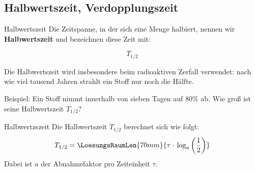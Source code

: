 \newpage

\subsection{Halbwertszeit, Verdopplungszeit}

\begin{definition}{Halbwertszeit}{}
Die Zeitspanne, in der sich eine Menge halbiert, nennen wir
\textbf{Halbwertszeit} und bezeichnen diese Zeit mit:

$$T_{1/2}$$
\end{definition}

Die Halbwertszeit wird insbesondere
  beim radioaktiven Zerfall verwendet: nach wie viel tausend Jahren strahlt
  ein Stoff nur noch die Hälfte.


Beispiel: Ein Stoff nimmt innerhalb von sieben Tagen auf 80\% ab. Wie
groß ist seine Halbwertszeit $T_{1/2}$?

\newpage




\begin{gesetz}{Halbwertzszeit}{}
  Die Halbwertszeit $T_{1/2}$ berechnet sich wie folgt:
  $$T_{1/2} = \LoesungsRaumLen{70mm}{\tau \cdot{} \log_a\left(\frac12\right)}$$
  Dabei ist $a$ der Abnahmefaktor pro Zeiteinheit $\tau$.
\end{gesetz}

